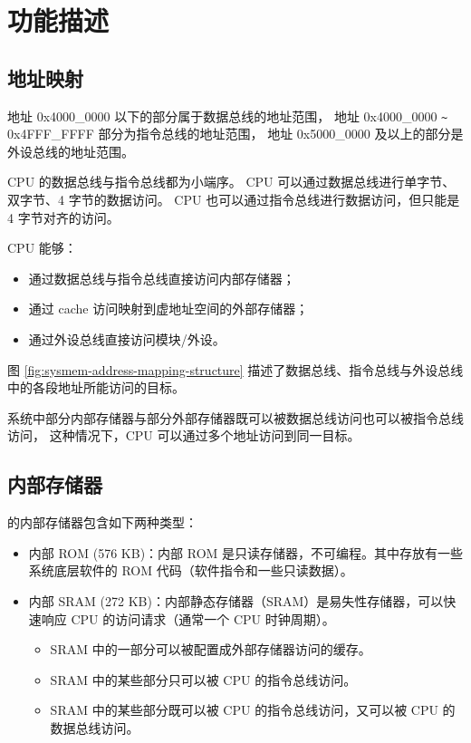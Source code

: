 \documentclass[main\_\_CN.tex]{subfiles}
\begin{document}
\section{功能描述}

\subsection{地址映射}

地址 0x4000\_0000 以下的部分属于数据总线的地址范围，
地址 0x4000\_0000 \verb+~+ 0x4FFF\_FFFF 部分为指令总线的地址范围，
地址 0x5000\_0000 及以上的部分是外设总线的地址范围。

CPU 的数据总线与指令总线都为小端序。
CPU 可以通过数据总线进行单字节、双字节、4 字节的数据访问。
CPU 也可以通过指令总线进行数据访问，但只能是 4 字节对齐的访问。

CPU 能够：
\begin{itemize}
\item 通过数据总线与指令总线直接访问内部存储器；
\item 通过 cache 访问映射到虚地址空间的外部存储器；
\item 通过外设总线直接访问模块/外设。
\end{itemize}

图 \ref{fig:sysmem-address-mapping-structure}    描述了数据总线、指令总线与外设总线中的各段地址所能访问的目标。

系统中部分内部存储器与部分外部存储器既可以被数据总线访问也可以被指令总线访问，
这种情况下，CPU 可以通过多个地址访问到同一目标。


\subsection{内部存储器}
\label{para:sysmem-internal-memory}

\chipname{} 的内部存储器包含如下两种类型：

\begin{itemize}
    \item 内部 ROM (576 KB)：内部 ROM 是只读存储器，不可编程。其中存放有一些系统底层软件的 ROM 代码（软件指令和一些只读数据）。
    \item 内部 SRAM (272 KB)：内部静态存储器（SRAM）是易失性存储器，可以快速响应 CPU 的访问请求（通常一个 CPU 时钟周期）。
    \begin{itemize}
        \item SRAM 中的一部分可以被配置成外部存储器访问的缓存。
        \item SRAM 中的某些部分只可以被 CPU 的指令总线访问。
        \item SRAM 中的某些部分既可以被 CPU 的指令总线访问，又可以被 CPU 的数据总线访问。
    \end{itemize}
\end{itemize}
\end{document}
